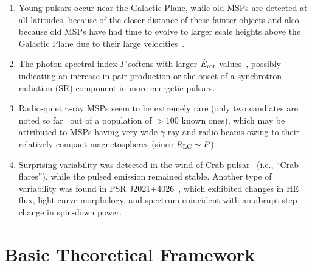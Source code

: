\documentclass{PoS}
\begin{document}
\begin{enumerate}
  \item Young pulsars occur near the Galactic Plane, while old MSPs are detected at all latitudes, because of the closer distance of these fainter objects and also because old MSPs have had time to evolve to larger scale heights above the Galactic Plane due to their large velocities~\cite{2PC}.
  \item The photon spectral index $\Gamma$ softens with larger $\dot{E}_{\rm rot}$ values~\cite{2PC}, possibly indicating an increase in pair production or the onset of a synchrotron radiation (SR) component in more energetic pulsars.
  \item Radio-quiet $\gamma$-ray MSPs seem to be extremely rare (only two candiates are noted so far~\cite{Acero13a, Kong14} out of a population of $>100$ known ones), which may be attributed to MSPs having very wide $\gamma$-ray and radio beams owing to their relatively compact magnetospheres (since $R_{\rm LC}\sim P$).
 \item Surprising variability was detected in the wind of Crab pulsar~\cite{AGILE_flares,Crab_flares} (i.e., ``Crab flares''), while the pulsed emission remained stable. Another type of variability was found in PSR J2021+4026~\cite{Allafort13}, which exhibited changes in HE flux, light curve morphology, and spectrum coincident with an abrupt step change in spin-down power.
\end{enumerate}

\section{Basic Theoretical Framework}\label{sec:Frame}
\end{document}
